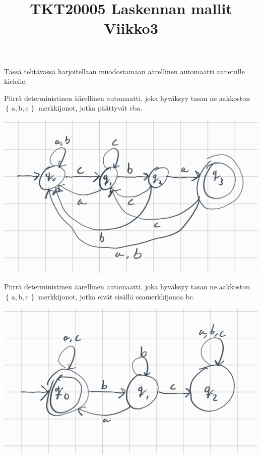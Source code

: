 \documentclass[12pt,a4paper]{article}
\title{TKT20005 Laskennan mallit Viikko3}
\date{}
\newcommand{\set}[1]{\left\{\,#1\,\right\}}
\begin{document}
\maketitle

 Tässä tehtävässä harjoitellaan muodostamaan äärellinen automaatti annetulle kielelle.
\begin{kohta}
\item
Piirrä deterministinen äärellinen automaatti, joka hyväksyy
tasan ne aakkoston $\set{\mathrm{a},\mathrm{b},\mathrm{c}}$
merkkijonot, jotka päättyvät cba.
\begin{center}
  \includegraphics[width=.6\textwidth]{viikko3tehtävä1a.jpg}
\end{center}

\item
Piirrä deterministinen äärellinen automaatti, joka hyväksyy tasan ne 
aakkoston $\set{\mathrm{a},\mathrm{b},\mathrm{c}}$ merkkijonot,
jotka eivät sisällä osamerkkijonoa bc.\\
\begin{center}
  \includegraphics[width=.6\textwidth]{viikko3tehtävä1b.jpg}
\end{center}


\end{kohta}
\end{document}

